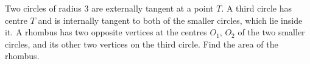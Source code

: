 Two circles of radius $3$ are externally tangent at a point $T$. A third circle has centre $T$ and is internally tangent to both of the smaller circles, which lie inside it. A rhombus has two opposite vertices at the centres $O_1$, $O_2$ of the two smaller circles, and its other two vertices on the third circle. Find the area of the rhombus.
